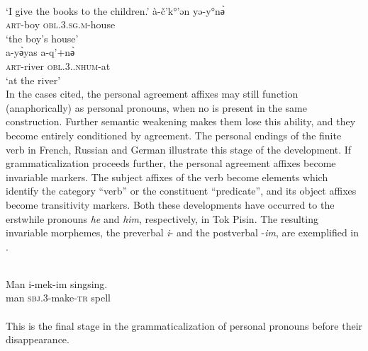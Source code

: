 \ea\label{ex:E10}
\langinfo{\LangAbkh}{}{} \\
 \ea
\glt ‘I give the books to the children.’
\ex 
\gll à-č'k°'ən  yə-y°n\`ә\\
 \textsc{art}-boy  \textsc{obl}.3.\textsc{sg.m}-house\\
\glt ‘the boy's house’\\
\ex
\gll a-y\`әyas  a-q'+n\`ә\\
 \textsc{art}-river  \textsc{obl}.3.\glsg.\textsc{nhum}-at\\
\glt ‘at the river’\\
\z
\z
\noindent In the cases cited, the personal agreement affixes may still function (anaphorically) as personal pronouns, when no \np is present in the same construction. Further semantic weakening makes them lose this ability, and they become entirely conditioned by agreement. The personal endings of the finite verb in French, Russian and German illustrate this stage of the development. If grammaticalization proceeds further, the personal agreement affixes become invariable markers. The subject affixes of the verb become elements which identify the category ``verb'' or the constituent ``predicate'', and its object affixes become transitivity markers. Both these developments have occurred to the erstwhile pronouns \textit{he} and \textit{him}, respectively, in Tok Pisin. The resulting invariable morphemes, the preverbal \textit{i}{}- and the postverbal -\textit{im}, are exemplified in .

\ea\label{ex:E11}
 \\
\gll  Man  i-mek-im  singsing.\\
man  \textsc{sbj}.3-make-\textsc{tr}  spell\\
 \\
\z
\noindent This is the final stage in the grammaticalization of personal pronouns before their disappearance.

